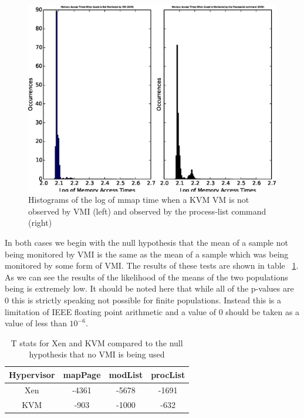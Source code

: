 	\begin{figure}[p!]\label{KVMMMapHist1}
	  \centering
	  \includegraphics[width=\textwidth]{figures/KVMMMApTestNoVMIvsProcList.eps}
	  \caption{Histograms of the log of mmap time when a KVM VM is not observed by VMI (left) and observed by the process-list command (right)}
	\end{figure}

In both cases we begin with the null hypothesis that the mean of a sample not being monitored by VMI is the same as the mean of a sample which was being monitored by some form of VMI. The results of these tests are shown in table ~\ref{TStatsMMap1}. 
As we can see the results of the likelihood of the means of the two populations being is extremely low. It should be noted here that while all of the p-values are 0 this is strictly speaking not possible for finite populations. Instead this is a limitation of IEEE floating point arithmetic and a value of 0 should be taken as a value of less than $10^{-6}$.

	\begin{table}[p!]
		\centering
		\begin{tabular}{| c | c | c | c |}
			\hline
			Hypervisor & mapPage & modList & procList  \\ \hline
			Xen & -4361 & -5678 & -1691  \\  \hline
			KVM & -903 & -1000 & -632  \\ \hline
		\end{tabular}
		\label{TStatsMMap1}
		\caption{T stats for Xen and KVM compared to the null hypothesis that no VMI is being used}
	\end{table}

